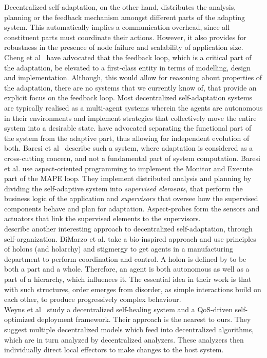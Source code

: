 \documentclass[10pt,journal,compsoc]{IEEEtran}
\begin{document}
Decentralized self-adaptation, on the other hand, distributes the analysis, planning or the feedback mechanism amongst different parts of the adapting system. This automatically implies a communication overhead, since all constituent parts must coordinate their actions. However, it also provides for robustness in the presence of node failure and scalability of application size. Cheng et al~\cite{Cheng2009Software} have advocated that the feedback loop, which is a critical part of the adaptation, be elevated to a first-class entity in terms of modelling, design and implementation. Although, this would allow for reasoning about properties of the adaptation, there are no systems that we currently know of, that provide an explicit focus on the feedback loop. Most decentralized self-adaptation systems are typically realised as a multi-agent systems wherein the agents are autonomous in their environments and implement strategies that collectively move the entire system into a desirable state. \cite{Cheng2005Making} have advocated separating the functional part of the system from the adaptive part, thus allowing for independent evolution of both. Baresi et al~\cite{Baresi2008Towards} describe such a system, where adaptation is considered as a cross-cutting concern, and not a fundamental part of system computation. Baresi et al. use aspect-oriented programming to implement the Monitor and Execute part of the MAPE loop. They implement distributed analysis and planning by dividing the self-adaptive system into \textit{supervised elements}, that perform the business logic of the application and \textit{supervisors} that oversee how the supervised components behave and plan for adaptation. Aspect-probes form the sensors and actuators that link the supervised elements to the supervisors. \\
\cite{Di2005Self-organization} describe another interesting approach to decentralized self-adaptation, through self-organization. DiMarzo et al. take a bio-inspired approach and use principles of holons (and holarchy) and stigmergy to get agents in a manufacturing department to perform coordination and control. A holon is defined by \cite{Koestler1990Ghost} to be both a part and a whole. Therefore, an agent is both autonomous as well as a part of a hierarchy, which influences it. The essential idea in their work is that with such structures, order emerges from disorder, as simple interactions build on each other, to produce progressively complex behaviour.\\
Weyns et al~\cite{Weyns2010decentralized} study a decentralized self-healing system and a QoS-driven self-optimized deployment framework. Their approach is the nearest to ours. They suggest multiple decentralized models which feed into decentralized algorithms, which are in turn analyzed by decentralized analyzers. These analyzers then individually direct local effectors to make changes to the host system.\\
\end{document}
